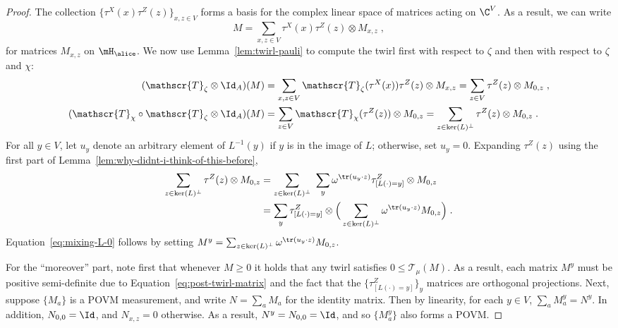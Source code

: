 \begin{proof}
  The collection $\{\tau^X(x)\tau^Z(z)\}_{x, z \in V}$ forms a basis for the
  complex linear space of matrices acting on $\C^V$.
  As a result, we can write
  \begin{equation*}
    M = \sum_{x, z \in V} \tau^X(x) \tau^Z(z) \otimes M_{x, z}\;,
  \end{equation*}
  for matrices $M_{x,z}$ on $\mH_\alice$.
  We now use Lemma~\ref{lem:twirl-pauli} to compute the twirl first with respect
  to $\zeta$ and then with respect to $\zeta$ and $\chi$:
  \begin{align*}
    (\mathscr{T}_{\zeta} \otimes \Id_{A})(M)
    &= \sum_{x, z \in V} \mathscr{T}_{\zeta}(\tau^X(x)) \tau^Z(z) \otimes M_{x, z}
      = \sum_{z \in V} \tau^Z(z) \otimes M_{0, z}\;,\\
    (\mathscr{T}_{\chi} \circ \mathscr{T}_{\zeta} \otimes \Id_{A})(M)
    &= \sum_{z \in V} \mathscr{T}_{\chi}(\tau^Z(z)) \otimes M_{0, z}
      =  \sum_{z \in \ker(L)^\perp} \tau^Z(z) \otimes M_{0, z}\;.
  \end{align*}
  For all $y \in V$, let $u_y$ denote an arbitrary element of $L^{-1}(y)$ if $y$
  is in the image of $L$; otherwise, set $u_y = 0$.
  Expanding $\tau^Z(z)$ using the first part of
  Lemma~\ref{lem:why-didnt-i-think-of-this-before},
  \begin{align}
    \label{eq:post-twirl-matrix}
    \sum_{z \in \ker(L)^\perp} \tau^Z(z) \otimes M_{0, z}
    & = \sum_{z \in \ker(L)^\perp} \,\, \sum_{y} \omega^{\tr(u_y \cdot z)}
      \tau^Z_{[L(\cdot)=y]} \otimes M_{0, z} \notag \\
    & =  \sum_{y} \tau^Z_{[L(\cdot)=y]} \otimes \Big(\sum_{z \in \ker(L)^\perp}
      \omega^{\tr(u_y \cdot z)}  M_{0, z}\Big)\;.
  \end{align}
  Equation~\eqref{eq:mixing-L-0} follows by setting $M^y = \sum_{z \in
    \ker(L)^\perp} \omega^{\tr(u_y \cdot z)} M_{0, z}$.

  For the ``moreover'' part, note first that whenever $M \geq 0$ it holds that
  any twirl satisfies $0 \leq \mathscr{T}_{\mu}(M)$.
  As a result, each matrix $M^y$ must be positive semi-definite due to
  Equation~\eqref{eq:post-twirl-matrix} and the fact that the
  $\{\tau^Z_{[L(\cdot)=y]}\}_y$ matrices are orthogonal projections.
  Next, suppose $\{M_a\}$ is a POVM measurement, and write $N = \sum_a M_a$ for
  the identity matrix.
  Then by linearity, for each $y \in V$, $\sum_a M_a^y = N^y$.
  In addition, $N_{0, 0} = \Id$, and $N_{x, z} = 0$ otherwise.
  As a result, $N^y = N_{0, 0} = \Id$, and so $\{M_a^y\}$ also forms a POVM.
\end{proof}

